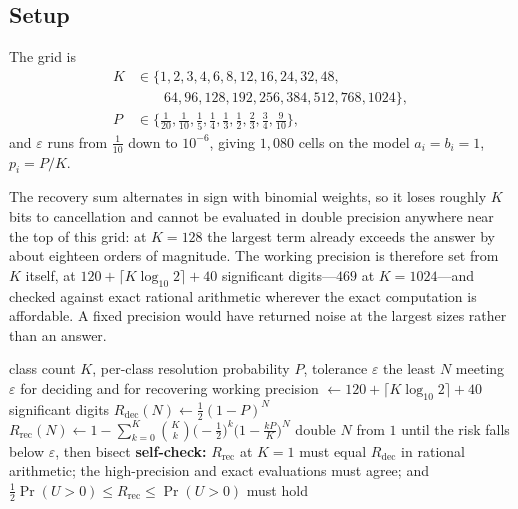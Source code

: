 \subsection{Setup}

The grid is
\begin{align*}
K &\in \{1,2,3,4,6,8,12,16,24,32,48,\\
  &\qquad 64,96,128,192,256,384,512,768,1024\},\\
P &\in \{\tfrac1{20},\tfrac1{10},\tfrac15,\tfrac14,\tfrac13,\tfrac12,\tfrac23,\tfrac34,\tfrac9{10}\},
\end{align*}
and $\varepsilon$ runs from $\tfrac1{10}$ down to $10^{-6}$, giving $1{,}080$ cells on the
model $a_{i}=b_{i}=1$, $p_{i}=P/K$.

The recovery sum alternates in sign with binomial weights, so it loses roughly $K$ bits to
cancellation and cannot be evaluated in double precision anywhere near the top of this grid:
at $K=128$ the largest term already exceeds the answer by about eighteen orders of magnitude.
The working precision is therefore set from $K$ itself, at
$120+\lceil K\log_{10}2\rceil+40$ significant digits---$469$ at $K=1024$---and checked
against exact rational arithmetic wherever the exact computation is affordable. A fixed
precision would have returned noise at the largest sizes rather than an answer.

\begin{algorithm}[htbp]
\caption{The two thresholds, at a precision set from $K$}
\label{alg:threshold}
\begin{algorithmic}[1]
\REQUIRE class count $K$, per-class resolution probability $P$, tolerance $\varepsilon$
\ENSURE the least $N$ meeting $\varepsilon$ for deciding and for recovering
\STATE working precision $\leftarrow 120+\lceil K\log_{10}2\rceil+40$ significant digits
\STATE $R_{\mathrm{dec}}(N)\leftarrow\tfrac12(1-P)^{N}$ 
\STATE $R_{\mathrm{rec}}(N)\leftarrow1-\sum_{k=0}^{K}\binom{K}{k}\bigl(-\tfrac12\bigr)^{k}
       \bigl(1-\tfrac{kP}{K}\bigr)^{N}$
  \STATE double $N$ from $1$ until the risk falls below $\varepsilon$, then bisect
\ENDFOR
\STATE \textbf{self-check:} $R_{\mathrm{rec}}$ at $K=1$ must equal $R_{\mathrm{dec}}$ in
       rational arithmetic; the high-precision and exact evaluations must agree; and
       $\tfrac12\Pr(U>0)\le R_{\mathrm{rec}}\le\Pr(U>0)$ must hold
\end{algorithmic}
\end{algorithm}

